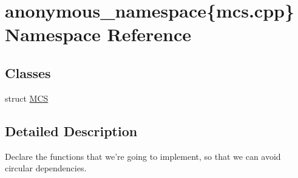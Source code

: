 \hypertarget{namespaceanonymous__namespace_02mcs_8cpp_03}{\section{anonymous\-\_\-namespace\{mcs.\-cpp\} Namespace Reference}
\label{namespaceanonymous__namespace_02mcs_8cpp_03}
}
\subsection*{Classes}
\begin{DoxyCompactItemize}
\item 
struct \hyperlink{structanonymous__namespace_02mcs_8cpp_03_1_1MCS}{M\-C\-S}
\end{DoxyCompactItemize}


\subsection{Detailed Description}
Declare the functions that we're going to implement, so that we can avoid circular dependencies. 
